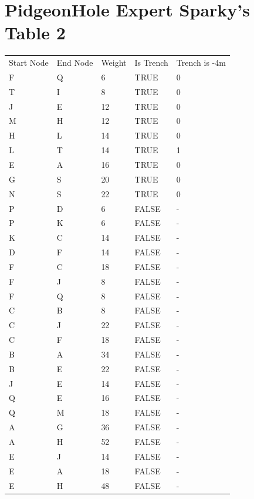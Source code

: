 \documentclass[11pt]{book}
\renewcommand{\=}[1]{\stackrel{#1}{=}} %
\theoremstyle{definition}
\theoremstyle{remark}
\begin{document}
\section{PidgeonHole Expert Sparky's Table 2}
\begin{table}[]
\begin{tabular}{lllll}
Start Node & End Node & Weight & Is Trench & Trench is -4m \\
\rowcolor[HTML]{FFCCC9} 
F & Q & 6 & TRUE & 0 \\
\rowcolor[HTML]{FFCCC9} 
T & I & 8 & TRUE & 0 \\
\rowcolor[HTML]{FFCCC9} 
J & E & 12 & TRUE & 0 \\
\rowcolor[HTML]{FFCCC9} 
M & H & 12 & TRUE & 0 \\
\rowcolor[HTML]{FFCCC9} 
H & L & 14 & TRUE & 0 \\
L & T & 14 & TRUE & 1 \\
\rowcolor[HTML]{FFCCC9} 
E & A & 16 & TRUE & 0 \\
\rowcolor[HTML]{FFCCC9} 
G & S & 20 & TRUE & 0 \\
\rowcolor[HTML]{FFCCC9} 
N & S & 22 & TRUE & 0 \\
P & D & 6 & FALSE & - \\
P & K & 6 & FALSE & - \\
K & C & 14 & FALSE & - \\
D & F & 14 & FALSE & - \\
F & C & 18 & FALSE & - \\
F & J & 8 & FALSE & - \\
\rowcolor[HTML]{9AFF99} 
F & Q & 8 & FALSE & - \\
C & B & 8 & FALSE & - \\
C & J & 22 & FALSE & - \\
C & F & 18 & FALSE & - \\
B & A & 34 & FALSE & - \\
B & E & 22 & FALSE & - \\
J & E & 14 & FALSE & - \\
Q & E & 16 & FALSE & - \\
Q & M & 18 & FALSE & - \\
A & G & 36 & FALSE & - \\
A & H & 52 & FALSE & - \\
\rowcolor[HTML]{9AFF99} 
E & J & 14 & FALSE & - \\
\rowcolor[HTML]{9AFF99} 
E & A & 18 & FALSE & - \\
E & H & 48 & FALSE & - \\

\end{tabular}
\end{table}
\end{document}
